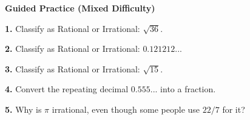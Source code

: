 \documentclass[12pt, letterpaper, fleqn]{article}
\begin{document}
\begin{tcolorbox}[colback=white!15, colframe=black, boxrule=1.5pt, arc=4mm, left=6mm, right=6mm, top=5mm, bottom=5mm]
\textbf{Guided Practice (Mixed Difficulty)}

\medskip
\textbf{1.} Classify as Rational or Irrational: $\sqrt{36}$. \vspace{1cm}

\textbf{2.} Classify as Rational or Irrational: $0.121212...$ \vspace{1cm}

\textbf{3.} Classify as Rational or Irrational: $\sqrt{15}$. \vspace{1cm}

\textbf{4.} Convert the repeating decimal $0.555...$ into a fraction. \vspace{1.5cm}

\textbf{5.} Why is $\pi$ irrational, even though some people use $22/7$ for it? \vspace{1.5cm}
\end{tcolorbox}
\end{document}
